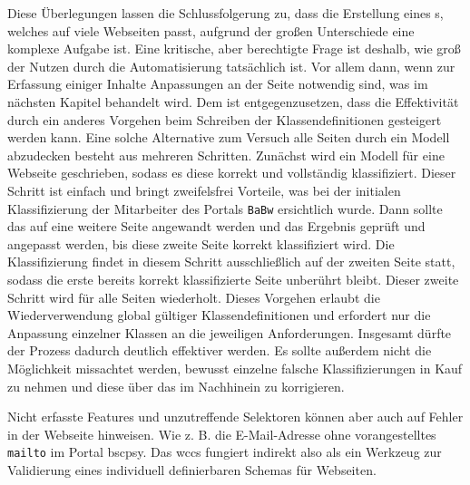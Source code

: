     Diese Überlegungen lassen die Schlussfolgerung zu,
    dass die Erstellung eines {\classificationModel}s,
    welches auf viele Webseiten passt,
    aufgrund der großen Unterschiede eine komplexe Aufgabe ist.
    Eine kritische, aber berechtigte Frage ist deshalb,
    wie groß der Nutzen durch die Automatisierung tatsächlich ist.
    Vor allem dann, wenn zur Erfassung einiger Inhalte Anpassungen an der Seite notwendig sind,
    was im nächsten Kapitel behandelt wird.
    Dem ist entgegenzusetzen, dass die Effektivität durch ein anderes Vorgehen beim
    Schreiben der Klassendefinitionen gesteigert werden kann.
    Eine solche Alternative zum Versuch alle Seiten durch ein Modell abzudecken
    besteht aus mehreren Schritten.
    Zunächst wird ein Modell für eine Webseite geschrieben,
    sodass es diese korrekt und vollständig klassifiziert.
    Dieser Schritt ist einfach und bringt zweifelsfrei Vorteile,
    was bei der initialen Klassifizierung der Mitarbeiter des Portals \texttt{BaBw} ersichtlich wurde.
    Dann sollte das {\classificationModel} auf eine weitere Seite angewandt werden und
    das Ergebnis geprüft und angepasst werden,
    bis diese zweite Seite korrekt klassifiziert wird.
    Die Klassifizierung findet in diesem Schritt ausschließlich auf der zweiten Seite statt,
    sodass die erste bereits korrekt klassifizierte Seite unberührt bleibt.
    Dieser zweite Schritt wird für alle Seiten wiederholt.
    Dieses Vorgehen erlaubt die Wiederverwendung global gültiger Klassendefinitionen
    und erfordert nur die Anpassung einzelner Klassen an die jeweiligen Anforderungen.
    Insgesamt dürfte der Prozess dadurch deutlich effektiver werden.
    Es sollte außerdem nicht die Möglichkeit missachtet werden,
    bewusst einzelne falsche Klassifizierungen in Kauf zu nehmen
    und diese über das {\annotatorPlugin} im Nachhinein zu korrigieren.

    Nicht erfasste Features und unzutreffende Selektoren können
    aber auch auf Fehler in der Webseite hinweisen.
    Wie z. B. die E-Mail-Adresse ohne vorangestelltes \texttt{mailto}
    im Portal \gls{bscpsy}.
    Das \gls{wccs} fungiert indirekt also als ein Werkzeug
    zur Validierung eines individuell definierbaren Schemas für Webseiten.